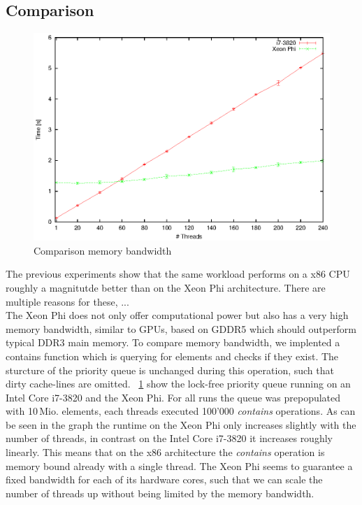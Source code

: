 \subsection{Comparison}
\begin{figure}[t]
	\centering
	\includegraphics[width=0.9\columnwidth]{../plots/comp_contains/runtime_contains}
	\caption{Comparison memory bandwidth}
	\label{fig:comp_contains}
\end{figure}
The previous experiments show that the same workload performs on a x86 CPU roughly a magnitutde better than on the Xeon Phi architecture. There are multiple reasons for these, ...\\ %
The Xeon Phi does not only offer computational power but also has a very high memory bandwidth, similar to GPUs, based on GDDR5 which should outperform typical DDR3 main memory. To compare memory bandwidth, we implented a contains function which is querying for elements and checks if they exist. The sturcture of the priority queue is unchanged during this operation, such that dirty cache-lines are omitted. \figurename~\ref{fig:comp_contains} show the lock-free priority queue running on an Intel Core i7-3820 and the Xeon Phi. For all runs the queue was prepopulated with 10\,Mio. elements, each threads executed 100'000 \textit{contains} operations. As can be seen in the graph the runtime on the Xeon Phi only increases slightly with the number of threads, in contrast on the Intel Core i7-3820 it increases roughly linearly. This means that on the x86 architecture the \textit{contains} operation is memory bound already with a single thread. The Xeon Phi seems to guarantee a fixed bandwidth for each of its hardware cores, such that we can scale the number of threads up without being limited by the memory bandwidth.\\


